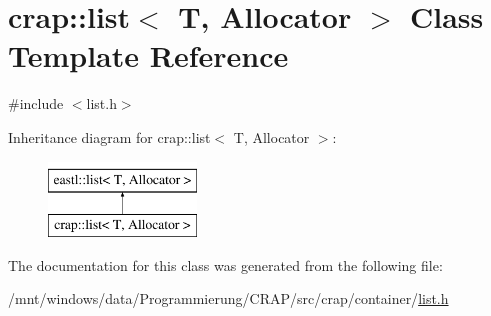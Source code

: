 \hypertarget{classcrap_1_1list}{\section{crap\-:\-:list$<$ T, Allocator $>$ Class Template Reference}
\label{classcrap_1_1list}
}


{\ttfamily \#include $<$list.\-h$>$}

Inheritance diagram for crap\-:\-:list$<$ T, Allocator $>$\-:\begin{figure}[H]
\begin{center}
\leavevmode
\includegraphics[height=2.000000cm]{classcrap_1_1list}
\end{center}
\end{figure}


The documentation for this class was generated from the following file\-:\begin{DoxyCompactItemize}
\item 
/mnt/windows/data/\-Programmierung/\-C\-R\-A\-P/src/crap/container/\hyperlink{list_8h}{list.\-h}\end{DoxyCompactItemize}
